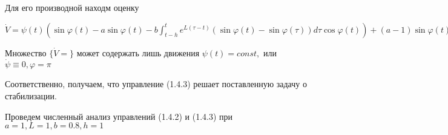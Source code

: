 Для его производной находм оценку

$\dot V = \psi (t) (\sin \varphi (t) - a \sin \varphi (t) - b \int_{t-h}^{t} e^{L (\tau - t)} (\sin \varphi (t) - \sin \varphi (\tau)) d \tau \cos \varphi (t)) + (a - 1) \sin \varphi (t) \psi (t) - \frac12 b e^{- L h} (\sin \varphi (t) - \sin \varphi (t - h))^2 + \cos \varphi (t) \int_{t-h}^{t} b e^{L (\tau - t)} (\sin \varphi (t) - \sin \varphi (\tau)) d \tau - \frac12 b L \int_{t-h}^{t} e^{L (\tau - t)} (\sin \varphi (t) - \sin \varphi (\tau))^2 d \tau = - \frac12 b e^{- L h} (\sin \varphi (t) - \sin \varphi (t - h))^2 - \frac12 b L \int_{t-h}^{t} e^{L (\tau - t)} (\sin \varphi (t) - \sin \varphi (\tau))^2 d \tau \le 0$

Множество $\lbrace \dot V = \rbrace$ может содержать лишь движения $\psi (t) = const,$ или $\dot \psi \equiv 0, \varphi = \pi$

Соответственно, получаем, что управление (1.4.3) решает поставленную задачу о стабилизации.

Проведем численный анализ управлений (1.4.2) и (1.4.3) при $a = 1, L = 1, b = 0.8, h = 1$